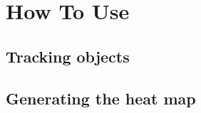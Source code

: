 \section{How To Use}
\label{04}

\subsection{Tracking objects}
\label{04_01}



\subsection{Generating the heat map}
\label{04_02}

